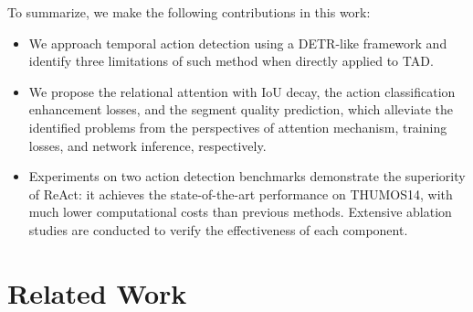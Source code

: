 \documentclass[runningheads]{llncs}
\begin{document}
To summarize, we make the following contributions in this work:

\begin{itemize}
    \item We approach temporal action detection using a DETR-like framework and identify three limitations of such method when directly applied to TAD.
    
    \item We propose the relational attention with IoU decay, the action classification enhancement losses, and the segment quality prediction, which alleviate the identified problems from the perspectives of attention mechanism, training losses, and network inference, respectively. 
    
    \item Experiments on two action detection benchmarks demonstrate the superiority of ReAct: it achieves the state-of-the-art performance on THUMOS14, with much lower computational costs than previous methods. Extensive ablation studies are conducted to verify the effectiveness of each component.
\end{itemize}



\section{Related Work}
\end{document}
